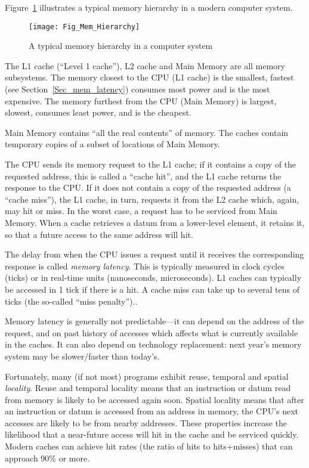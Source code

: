 Figure~\ref{Fig_Mem_Hierarchy} illustrates a typical memory hierarchy
in a modern computer system.
\begin{figure}[htbp]
  \centerline{\texttt{[image: Fig\_Mem\_Hierarchy]}}
  \caption{\label{Fig_Mem_Hierarchy}
           A typical memory hierarchy in a computer system}
\end{figure}
The L1 cache (``Level 1 cache''), L2 cache and Main Memory are all
memory subsystems.  The memory closest to the CPU (L1 cache) is the
smallest, fastest (see Section~\ref{Sec_mem_latency}) consumes most
power and is the most expensive.  The memory furthest from the CPU
(Main Memory) is largest, slowest, consumes least power, and is the
cheapest.

Main Memory contains ``all the real contents'' of memory.  The caches
contain temporary copies of a subset of locations of Main Memory.


The CPU sends its memory request to the L1 cache; if it contains a
copy of the requested address, this is called a ``cache hit'', and the
L1 cache returns the response to the CPU.  If it does not contain a
copy of the requested address (a ``cache miss''), the L1 cache, in
turn, requests it from the L2 cache which, again, may hit or miss.  In
the worst case, a request has to be serviced from Main Memory.  When a
cache retrieves a datum from a lower-level element, it retains it, so
that a future access to the same address will hit.

\label{Sec_mem_latency}


The delay from when the CPU issues a request until it receives the
corresponding response is called \emph{memory latency}.  This is
typically measured in clock cycles (ticks) or in real-time units
(nanoseconds, microseconds).  L1 caches can typically be accessed in 1
tick if there is a hit.  A cache miss can take up to several tens of
ticks (the so-called ``miss penalty'')..

Memory latency is generally not predictable---it can depend on the
address of the request, and on past history of accesses which affects
what is currently available in the caches.  It can also depend on
technology replacement: next year's memory system may be slower/faster
than today's.

Fortunately, many (if not most) programs exhibit reuse, temporal and
spatial \emph{locality}. Reuse and temporal locality means that an
instruction or datum read from memory is likely to be accessed again
soon.  Spatial locality means that after an instruction or datum is
accessed from an address in memory, the CPU's next accesses are likely
to be from nearby addresses.  These properties increase the likelihood
that a near-future access will hit in the cache and be serviced
quickly.  Modern caches can achieve hit rates (the ratio of hits to
hits+misses) that can approach 90\% or more.

